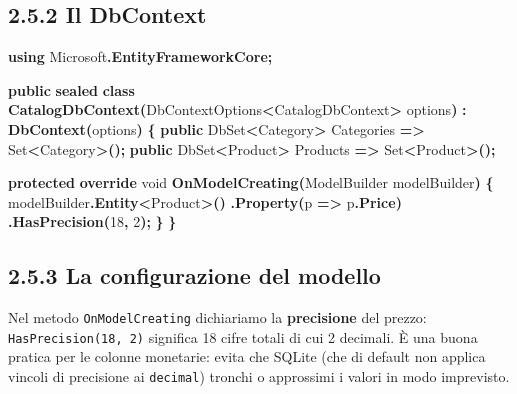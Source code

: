 \documentclass[
  italian,
  10pt,
]{book}
\newenvironment{Shaded}{\begin{snugshade}}{\end{snugshade}}
\newcommand{\DataTypeTok}[1]{\textcolor[rgb]{0.13,0.29,0.53}{#1}}
\newcommand{\DecValTok}[1]{\textcolor[rgb]{0.00,0.00,0.81}{#1}}
\newcommand{\FunctionTok}[1]{\textcolor[rgb]{0.13,0.29,0.53}{\textbf{#1}}}
\newcommand{\KeywordTok}[1]{\textcolor[rgb]{0.13,0.29,0.53}{\textbf{#1}}}
\newcommand{\NormalTok}[1]{#1}
\newcommand{\OperatorTok}[1]{\textcolor[rgb]{0.81,0.36,0.00}{\textbf{#1}}}
\begin{document}
\subsection{2.5.2 Il DbContext}\label{il-dbcontext-1}

\begin{Shaded}
\begin{Highlighting}[]
\KeywordTok{using}\NormalTok{ Microsoft}\OperatorTok{.}\FunctionTok{EntityFrameworkCore}\OperatorTok{;}

\KeywordTok{public} \KeywordTok{sealed} \KeywordTok{class} \FunctionTok{CatalogDbContext}\OperatorTok{(}\NormalTok{DbContextOptions}\OperatorTok{\textless{}}\NormalTok{CatalogDbContext}\OperatorTok{\textgreater{}}\NormalTok{ options}\OperatorTok{)}
    \OperatorTok{:} \FunctionTok{DbContext}\OperatorTok{(}\NormalTok{options}\OperatorTok{)}
\OperatorTok{\{}
    \KeywordTok{public}\NormalTok{ DbSet}\OperatorTok{\textless{}}\NormalTok{Category}\OperatorTok{\textgreater{}}\NormalTok{ Categories }\OperatorTok{=\textgreater{}}\NormalTok{ Set}\OperatorTok{\textless{}}\NormalTok{Category}\OperatorTok{\textgreater{}();}
    \KeywordTok{public}\NormalTok{ DbSet}\OperatorTok{\textless{}}\NormalTok{Product}\OperatorTok{\textgreater{}}\NormalTok{ Products }\OperatorTok{=\textgreater{}}\NormalTok{ Set}\OperatorTok{\textless{}}\NormalTok{Product}\OperatorTok{\textgreater{}();}

    \KeywordTok{protected} \KeywordTok{override} \DataTypeTok{void} \FunctionTok{OnModelCreating}\OperatorTok{(}\NormalTok{ModelBuilder modelBuilder}\OperatorTok{)}
    \OperatorTok{\{}
\NormalTok{        modelBuilder}\OperatorTok{.}\FunctionTok{Entity}\OperatorTok{\textless{}}\NormalTok{Product}\OperatorTok{\textgreater{}()}
            \OperatorTok{.}\FunctionTok{Property}\OperatorTok{(}\NormalTok{p }\OperatorTok{=\textgreater{}}\NormalTok{ p}\OperatorTok{.}\FunctionTok{Price}\OperatorTok{)}
            \OperatorTok{.}\FunctionTok{HasPrecision}\OperatorTok{(}\DecValTok{18}\OperatorTok{,} \DecValTok{2}\OperatorTok{);}
    \OperatorTok{\}}
\OperatorTok{\}}
\end{Highlighting}
\end{Shaded}

\subsection{2.5.3 La configurazione del
modello}\label{la-configurazione-del-modello}

Nel metodo \texttt{OnModelCreating} dichiariamo la \textbf{precisione}
del prezzo: \texttt{HasPrecision(18,\ 2)} significa 18 cifre totali di
cui 2 decimali. È una buona pratica per le colonne monetarie: evita che
SQLite (che di default non applica vincoli di precisione ai
\texttt{decimal}) tronchi o approssimi i valori in modo imprevisto.
\end{document}
